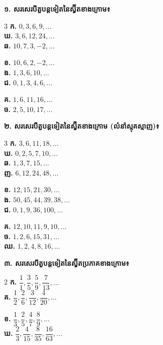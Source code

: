 \documentclass[11pt,a4paper]{article}
\begin{document}
\textbf{១. សរសេរបីតួបន្តទៀតនៃស្វ៊ីតខាងក្រោម៖}
\begin{multicols}{3}
\textbf{ក.} $0, 3, 6, 9, \dots$\\[5pt]
\textbf{ឃ.} $3, 6, 12, 24, \dots$\\[5pt]
\textbf{ឆ.} $10, 7, 3, -2, \dots$

\columnbreak
\textbf{ខ.} $10, 6, 2, -2, \dots$\\[5pt]
\textbf{ង.} $1, 3, 6, 10, \dots$\\[5pt]
\textbf{ជ.} $0, 1, 3, 4, 6, \dots$

\columnbreak
\textbf{គ.} $1, 6, 11, 16, \dots$\\[5pt]
\textbf{ច.} $2, 5, 10, 17, \dots$
\end{multicols}

\vspace{1pt}
\textbf{២. សរសេរបីតួបន្តទៀតនៃស្វ៊ីតខាងក្រោម (លំនាំស្មុគស្មាញ)៖}
\begin{multicols}{3}
\textbf{ក.} $3, 6, 11, 18, \dots$\\[5pt]
\textbf{ឃ.} $0, 2, 5, 7, 10, \dots$\\[5pt]
\textbf{ឆ.} $1, 3, 7, 15, \dots$\\[5pt]
\textbf{ញ.} $6, 12, 24, 48, \dots$

\columnbreak
\textbf{ខ.} $12, 15, 21, 30, \dots$\\[5pt]
\textbf{ង.} $50, 45, 44, 39, 38, \dots$\\[5pt]
\textbf{ជ.} $0, 1, 9, 36, 100, \dots$

\columnbreak
\textbf{គ.} $12, 10, 11, 9, 10, \dots$\\[5pt]
\textbf{ច.} $1, 2, 6, 15, 31, \dots$\\[5pt]
\textbf{ឈ.} $1, 2, 4, 8, 16, \dots$
\end{multicols}

\vspace{1pt}
\textbf{៣. សរសេរបីតួបន្តទៀតនៃស្វ៊ីតប្រភាគខាងក្រោម៖}
\begin{multicols}{2}
\textbf{ក.} $\dfrac{1}{1}, \dfrac{3}{5}, \dfrac{5}{9}, \dfrac{7}{13}, \dots$\\[8pt]
\textbf{គ.} $\dfrac{1}{2}, \dfrac{2}{6}, \dfrac{3}{12}, \dfrac{4}{20}, \dots$

\columnbreak
\textbf{ខ.} $\dfrac{1}{3}, \dfrac{2}{5}, \dfrac{4}{7}, \dfrac{8}{9}, \dots$\\[8pt]
\textbf{ឃ.} $\dfrac{2}{3}, \dfrac{4}{15}, \dfrac{8}{35}, \dfrac{16}{63}, \dots$
\end{multicols}
\end{document}
